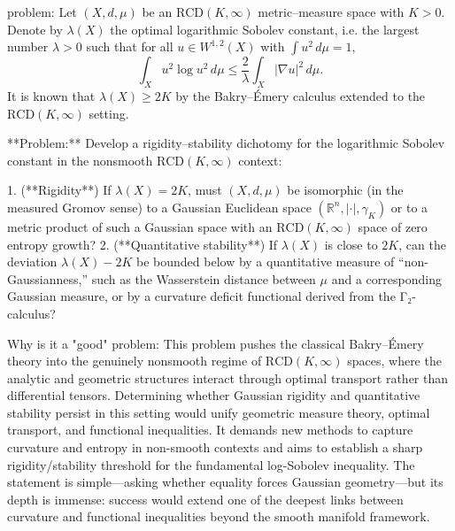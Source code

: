 problem:  
Let \((X,d,\mu)\) be an \(\mathrm{RCD}(K,\infty)\) metric–measure space with \(K>0\). Denote by \(\lambda(X)\) the optimal logarithmic Sobolev constant, i.e. the largest number \(\lambda>0\) such that for all \(u\in W^{1,2}(X)\) with \(\int u^2\,d\mu =1\),
\[
\int_X u^2\log u^2\,d\mu \le \frac{2}{\lambda}\int_X |\nabla u|^2\,d\mu .
\]
It is known that \(\lambda(X)\ge 2K\) by the Bakry–Émery calculus extended to the \(\mathrm{RCD}(K,\infty)\) setting.  

**Problem:**  
Develop a rigidity–stability dichotomy for the logarithmic Sobolev constant in the nonsmooth \(\mathrm{RCD}(K,\infty)\) context:

1. (**Rigidity**) If \(\lambda(X)=2K\), must \((X,d,\mu)\) be isomorphic (in the measured Gromov sense) to a Gaussian Euclidean space \((\mathbb{R}^n,|\cdot|,\gamma_K)\) or to a metric product of such a Gaussian space with an \(\mathrm{RCD}(K,\infty)\) space of zero entropy growth?  
2. (**Quantitative stability**) If \(\lambda(X)\) is close to \(2K\), can the deviation \(\lambda(X)-2K\) be bounded below by a quantitative measure of “non-Gaussianness,” such as the Wasserstein distance between \(\mu\) and a corresponding Gaussian measure, or by a curvature deficit functional derived from the Γ₂-calculus?

Why is it a "good" problem:  
This problem pushes the classical Bakry–Émery theory into the genuinely nonsmooth regime of \(\mathrm{RCD}(K,\infty)\) spaces, where the analytic and geometric structures interact through optimal transport rather than differential tensors. Determining whether Gaussian rigidity and quantitative stability persist in this setting would unify geometric measure theory, optimal transport, and functional inequalities. It demands new methods to capture curvature and entropy in non-smooth contexts and aims to establish a sharp rigidity/stability threshold for the fundamental log-Sobolev inequality. The statement is simple—asking whether equality forces Gaussian geometry—but its depth is immense: success would extend one of the deepest links between curvature and functional inequalities beyond the smooth manifold framework.